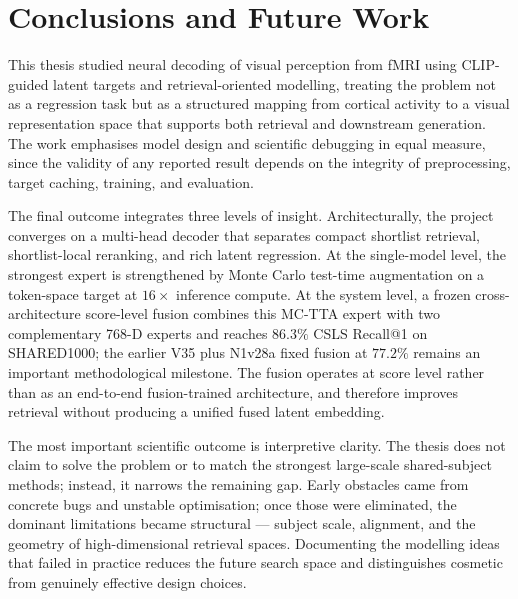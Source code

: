 
\chapter{Conclusions and Future Work}
\label{chap:conclusions}

This thesis studied neural decoding of visual perception from fMRI using CLIP-guided latent targets and retrieval-oriented modelling, treating the problem not as a regression task but as a structured mapping from cortical activity to a visual representation space that supports both retrieval and downstream generation. The work emphasises model design and scientific debugging in equal measure, since the validity of any reported result depends on the integrity of preprocessing, target caching, training, and evaluation.

The final outcome integrates three levels of insight. Architecturally, the project converges on a multi-head decoder that separates compact shortlist retrieval, shortlist-local reranking, and rich latent regression. At the single-model level, the strongest expert is strengthened by Monte Carlo test-time augmentation on a token-space target at $16\times$ inference compute. At the system level, a frozen cross-architecture score-level fusion combines this MC-TTA expert with two complementary 768-D experts and reaches $86.3\%$ CSLS Recall@1 on SHARED1000; the earlier V35 plus N1v28a fixed fusion at $77.2\%$ remains an important methodological milestone. The fusion operates at score level rather than as an end-to-end fusion-trained architecture, and therefore improves retrieval without producing a unified fused latent embedding.

The most important scientific outcome is interpretive clarity. The thesis does not claim to solve the problem or to match the strongest large-scale shared-subject methods; instead, it narrows the remaining gap. Early obstacles came from concrete bugs and unstable optimisation; once those were eliminated, the dominant limitations became structural --- subject scale, alignment, and the geometry of high-dimensional retrieval spaces. Documenting the modelling ideas that failed in practice reduces the future search space and distinguishes cosmetic from genuinely effective design choices.

